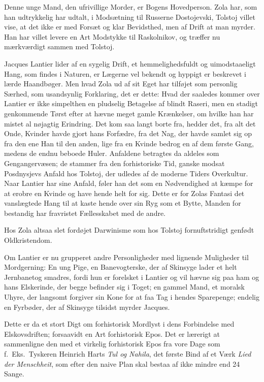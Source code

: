 \documentclass[12pt,a4paper]{article}
\begin{document}
Denne unge Mand, den ufrivillige Morder, er Bogens Hovedperson. Zola
har, som han udtrykkelig har udtalt, i Modsætning til Russerne Dostojevski,
Tolstoj villet vise, at det ikke er med Forsæt og klar Bevidsthed, men
af Drift at man myrder. Han har villet levere en Art Modstykke til
Raskolnikov, og træffer nu mærkværdigt sammen med Tolstoj.

Jacques Lantier lider af en sygelig Drift, et hemmelighedsfuldt og
uimodstaaeligt Hang, som findes i Naturen, er Lægerne vel bekendt og
hyppigt er beskrevet i lærde Haandbøger. Men hvad Zola ud af sit Eget
har tilføjet som personlig Særhed, som usandsynlig Forklaring, det er
dette: Hvad der saaledes kommer over Lantier er ikke simpelthen en
pludselig Betagelse af blindt Raseri, men en stadigt genkommende Tørst
efter at hævne meget gamle Krænkelser, om hvilke han har mistet al
nøjagtig Erindring. Det kom saa langt borte fra, hedder det, fra alt det
Onde, Kvinder havde gjort hans Forfædre, fra det Nag, der havde samlet
sig op fra den ene Han til den anden, lige fra en Kvinde bedrog en af dem
første Gang, medens de endnu beboede Huler. Anfaldene betragtes da
aldeles som Gengangervæsen; de stammer fra den forhistoriske Tid, ganske
modsat Posdnysjevs Anfald hos Tolstoj, der udledes af de moderne Tiders
Overkultur. Naar Lantier har sine Anfald, føler han det som en
Nødvendighed at kæmpe for at erobre en Kvinde og have hende helt for sig.
Dette er for Zolas Fantasi det vanslægtede Hang til at kaste hende over
sin Ryg som et Bytte, Manden for bestandig har fravristet Fællesskabet
med de andre.

Hos Zola altsaa slet fordøjet Darwinisme som hos Tolstoj fornuftstridigt
genfødt Oldkristendom.

Om Lantier er nu grupperet andre Personligheder med lignende Muligheder
til Mordgerning: En ung Pige, en Banevogterske, der af Skinsyge lader et
helt Jernbanetog smadres, fordi hun er forelsket i Lantier og vil hævne
sig paa ham og hans Elskerinde, der begge befinder sig i Toget; en gammel
Mand, et moralsk Uhyre, der langsomt forgiver sin Kone for at faa Tag i
hendes Sparepenge; endelig en Fyrbøder, der af Skinsyge tilsidst myrder
Jacques.

Dette er da et stort Digt om forhistorisk Mordlyst i dens Forbindelse med
Elskovsdriften; forsaavidt en Art forhistorisk Epos. Det er lærerigt at
sammenligne den med et virkelig forhistorisk Epos fra vore Dage som
f.\ Eks.\ Tyskeren Heinrich Harts \textit{Tul og Nahila}, det første Bind
af et Værk \textit{Lied der Menschheit}, som efter den naive Plan skal
bestaa af ikke mindre end 24 Sange.
\end{document}
